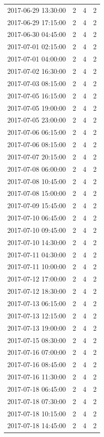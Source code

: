 \begin{tabular}{lrrr}
2017-06-29 13:30:00 & 2 & 4 & 2 \\
2017-06-29 17:15:00 & 2 & 4 & 2 \\
2017-06-30 04:45:00 & 2 & 4 & 2 \\
2017-07-01 02:15:00 & 2 & 4 & 2 \\
2017-07-01 04:00:00 & 2 & 4 & 2 \\
2017-07-02 16:30:00 & 2 & 4 & 2 \\
2017-07-03 08:15:00 & 2 & 4 & 2 \\
2017-07-05 16:15:00 & 2 & 4 & 2 \\
2017-07-05 19:00:00 & 2 & 4 & 2 \\
2017-07-05 23:00:00 & 2 & 4 & 2 \\
2017-07-06 06:15:00 & 2 & 4 & 2 \\
2017-07-06 08:15:00 & 2 & 4 & 2 \\
2017-07-07 20:15:00 & 2 & 4 & 2 \\
2017-07-08 06:00:00 & 2 & 4 & 2 \\
2017-07-08 10:45:00 & 2 & 4 & 2 \\
2017-07-08 15:00:00 & 2 & 4 & 2 \\
2017-07-09 15:45:00 & 2 & 4 & 2 \\
2017-07-10 06:45:00 & 2 & 4 & 2 \\
2017-07-10 09:45:00 & 2 & 4 & 2 \\
2017-07-10 14:30:00 & 2 & 4 & 2 \\
2017-07-11 04:30:00 & 2 & 4 & 2 \\
2017-07-11 10:00:00 & 2 & 4 & 2 \\
2017-07-12 17:00:00 & 2 & 4 & 2 \\
2017-07-12 18:30:00 & 2 & 4 & 2 \\
2017-07-13 06:15:00 & 2 & 4 & 2 \\
2017-07-13 12:15:00 & 2 & 4 & 2 \\
2017-07-13 19:00:00 & 2 & 4 & 2 \\
2017-07-15 08:30:00 & 2 & 4 & 2 \\
2017-07-16 07:00:00 & 2 & 4 & 2 \\
2017-07-16 08:45:00 & 2 & 4 & 2 \\
2017-07-16 11:30:00 & 2 & 4 & 2 \\
2017-07-18 06:45:00 & 2 & 4 & 2 \\
2017-07-18 07:30:00 & 2 & 4 & 2 \\
2017-07-18 10:15:00 & 2 & 4 & 2 \\
2017-07-18 14:45:00 & 2 & 4 & 2 \\

\end{tabular}
